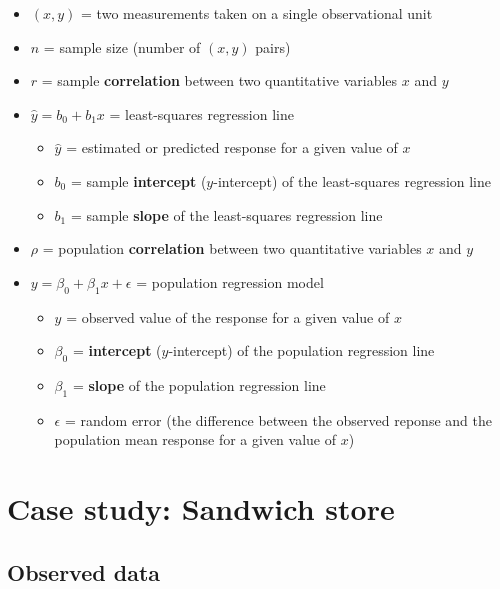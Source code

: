\documentclass[
  10pt,
  openany]{book}
\providecommand{\tightlist}{%
  \setlength{\itemsep}{0pt}\setlength{\parskip}{0pt}}
\theoremstyle{definition}
\theoremstyle{definition}
\theoremstyle{definition}
\theoremstyle{definition}
\theoremstyle{remark}
\begin{document}
\begin{itemize}
\tightlist
\item
  \((x, y)\) = two measurements taken on a single observational unit
\item
  \(n\) = sample size (number of \((x, y)\) pairs)
\item
  \(r\) = sample \textbf{correlation} between two quantitative variables \(x\) and \(y\)
\item
  \(\hat{y} = b_0 + b_1 x\) = least-squares regression line

  \begin{itemize}
  \tightlist
  \item
    \(\hat{y}\) = estimated or predicted response for a given value of \(x\)
  \item
    \(b_0\) = sample \textbf{intercept} (\(y\)-intercept) of the least-squares regression line
  \item
    \(b_1\) = sample \textbf{slope} of the least-squares regression line
  \end{itemize}
\item
  \(\rho\) = population \textbf{correlation} between two quantitative variables \(x\) and \(y\)
\item
  \(y = \beta_0 + \beta_1 x + \epsilon\) = population regression model

  \begin{itemize}
  \tightlist
  \item
    \(y\) = observed value of the response for a given value of \(x\)
  \item
    \(\beta_0\) = \textbf{intercept} (\(y\)-intercept) of the population regression line
  \item
    \(\beta_1\) = \textbf{slope} of the population regression line
  \item
    \(\epsilon\) = random error (the difference between the observed reponse and the population mean response for a given value of \(x\))
  \end{itemize}
\end{itemize}

\section{Case study: Sandwich store}\label{case-study-sandwich-store}

\subsection{Observed data}\label{observed-data-13}
\end{document}
